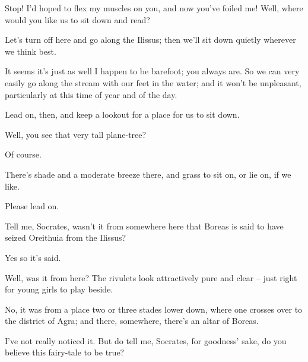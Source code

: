 Stop! I'd hoped to flex my muscles on you, and now you've
foiled me! Well, where
would you like us to sit  down and read?

Let's turn off here and go along the
Ilissus; then 
we'll sit down quietly wherever we think best.

It seems it's just as well I happen to be barefoot; you always
are. So we can very easily go along the stream with  our feet in
the water; and it won't be unpleasant, particularly at this time of year
and of the day.

Lead on, then, and keep a lookout for a place for us to sit
down.

Well, you see that very tall plane-tree?

Of course.

There's shade and a moderate breeze there, and  grass
to sit on, or lie on, if we like.

Please lead on.

Tell me, Socrates, wasn't it from somewhere here that Boreas is
said to have seized
Oreithuia from the
Ilissus? 

Yes so it's said.

Well, was it from here? The rivulets look attractively pure and
clear -- just right for young girls to play beside.

No, it was from a place two or three stades lower 
down, where one crosses over to the district of
Agra; and there,
somewhere, there's an altar of Boreas.

I've not really noticed it. But do tell me, Socrates, 
for goodness' sake, do
you believe this fairy-tale to be true?

